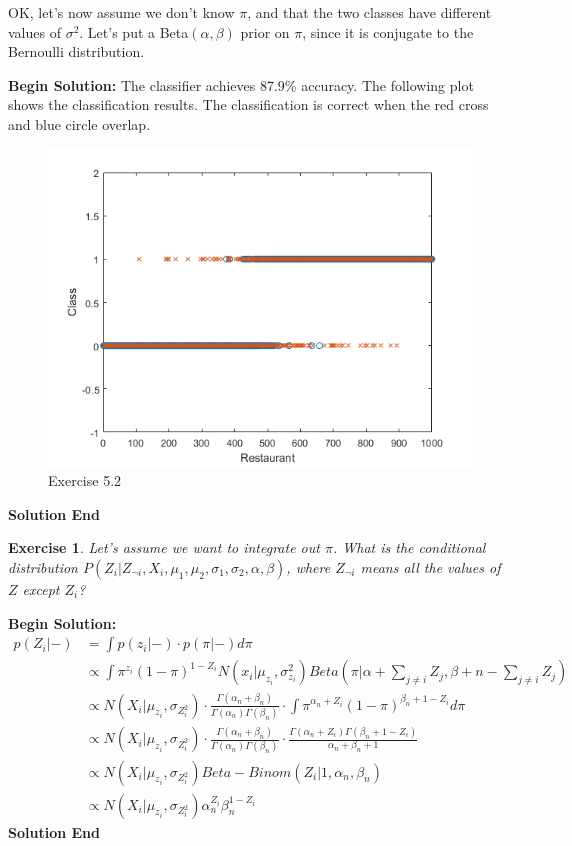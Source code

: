 \documentclass[twoside]{article}
\newcounter{lecnum}
\newtheorem{exercise}{Exercise}[lecnum]
\begin{document}
OK, let's now assume we don't know $\pi$, and that the two classes have different values of $\sigma^2$. Let's put a Beta$(\alpha,\beta)$ prior on $\pi$, since it is conjugate to the Bernoulli distribution. 


\textbf{Begin Solution:}
The classifier achieves 87.9\% accuracy. The following plot shows the classification results. The classification is correct when the red cross and blue circle overlap.
\begin{figure}[H]
\begin{center}
\includegraphics[width=\textwidth]{./exercise_5_2/class.png}
\end{center}
\caption{Exercise 5.2}
\end{figure} 
\textbf{Solution End}


\begin{exercise}
  Let's assume we want to integrate out $\pi$. What is the conditional distribution $P(Z_i|Z_{\neg i}, X_i,\mu_1,\mu_2,\sigma_1,\sigma_2,\alpha,\beta)$, where $Z_{\neg i}$ means all the values of $Z$ except $Z_i$?
\end{exercise}

\textbf{Begin Solution:}
\begin{equation*}
\begin{split}
p(Z_i|-) &= \int p(z_i|-) \cdot p(\pi|-) d\pi\\
&\propto \int \pi^{z_i} (1-\pi)^{1-Z_i} N(x_i|\mu_{z_i},\sigma^2_{z_i}) Beta(\pi|\alpha + \sum_{j\neq i}Z_j,\beta+n-\sum_{j\neq i}Z_j)\\
&\propto N(X_i|\mu_{z_i},\sigma_{Z_i^2})\cdot \frac{\Gamma(\alpha_n+\beta_n)}{\Gamma(\alpha_n)\Gamma(\beta_n)} \cdot \int \pi^{\alpha_n+Z_i} (1-\pi)^{\beta_n+1-Z_i} d\pi\\
&\propto N(X_i|\mu_{z_i},\sigma_{Z_i^2})\cdot \frac{\Gamma(\alpha_n+\beta_n)}{\Gamma(\alpha_n)\Gamma(\beta_n)} \cdot \frac{\Gamma(\alpha_n+Z_i)\Gamma(\beta_n+1-Z_i)}{\alpha_n+\beta_n+1}\\
&\propto N(X_i|\mu_{z_i},\sigma_{Z_i^2}) Beta-Binom(Z_i|1,\alpha_n,\beta_n)\\
&\propto N(X_i|\mu_{z_i},\sigma_{Z_i^2})\alpha_n^{Z_i}\beta_n^{1-Z_i}
\end{split}
\end{equation*}
\textbf{Solution End}
\end{document}
